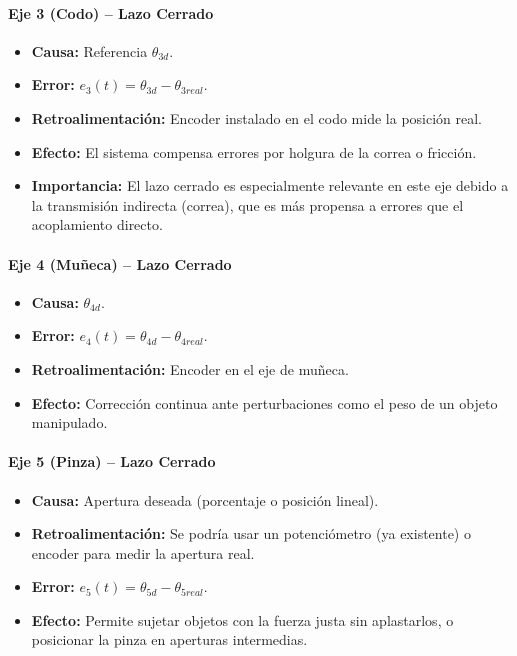 \documentclass[11pt]{article}
\begin{document}
\paragraph{Eje 3 (Codo) – Lazo Cerrado}
\begin{itemize}
	\item \textbf{Causa:} Referencia $\theta_{3d}$.
	\item \textbf{Error:} $e_3(t) = \theta_{3d} - \theta_{3real}$.
	\item \textbf{Retroalimentación:} Encoder instalado en el codo mide la posición real.
	\item \textbf{Efecto:} El sistema compensa errores por holgura de la correa o fricción.
	\item \textbf{Importancia:} El lazo cerrado es especialmente relevante en este eje debido a la transmisión indirecta (correa), que es más propensa a errores que el acoplamiento directo.
\end{itemize}

\paragraph{Eje 4 (Muñeca) – Lazo Cerrado}
\begin{itemize}
	\item \textbf{Causa:} $\theta_{4d}$.
	\item \textbf{Error:} $e_4(t) = \theta_{4d} - \theta_{4real}$.
	\item \textbf{Retroalimentación:} Encoder en el eje de muñeca.
	\item \textbf{Efecto:} Corrección continua ante perturbaciones como el peso de un objeto manipulado.
\end{itemize}

\paragraph{Eje 5 (Pinza) – Lazo Cerrado}
\begin{itemize}
	\item \textbf{Causa:} Apertura deseada (porcentaje o posición lineal).
	\item \textbf{Retroalimentación:} Se podría usar un potenciómetro (ya existente) o encoder para medir la apertura real.
	\item \textbf{Error:} $e_5(t) = \theta_{5d} - \theta_{5real}$.
	\item \textbf{Efecto:} Permite sujetar objetos con la fuerza justa sin aplastarlos, o posicionar la pinza en aperturas intermedias.
\end{itemize}
\end{document}
